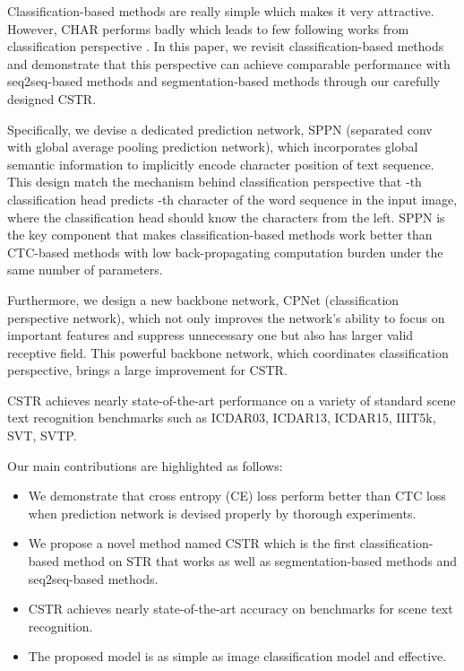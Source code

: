 \documentclass[final]{cvpr}
\begin{document}
Classification-based methods \cite{jaderberg14c} are really simple which makes it very attractive. However, CHAR performs badly which leads to few following works from classification perspective \cite{borisyuk2018rosetta}. In this paper, we revisit classification-based methods and demonstrate that this perspective can achieve comparable performance with seq2seq-based methods and segmentation-based methods through our carefully designed CSTR.

Specifically, we devise a dedicated prediction network, SPPN (separated conv with global average pooling prediction network), which incorporates global semantic information to implicitly encode character position of text sequence. This design match the mechanism behind classification perspective that -th classification head predicts -th character of the word sequence in the input image, where the classification head should know the  characters from the left. SPPN is the key component that makes classification-based methods work better than CTC-based methods with low back-propagating computation burden under the same number of parameters.

Furthermore, we design a new backbone network, CPNet (classification perspective network), which not only improves the network's ability to focus on important features and suppress unnecessary one but also has larger valid receptive field. This powerful backbone network, which coordinates classification perspective, brings a large improvement for CSTR.

CSTR achieves nearly state-of-the-art performance on a variety of standard scene text recognition benchmarks such as ICDAR03, ICDAR13, ICDAR15, IIIT5k, SVT, SVTP.

Our main contributions are highlighted as follows:
\begin{itemize}

\item We demonstrate that cross entropy (CE) loss perform better than CTC loss when prediction network is devised properly by thorough experiments.

\item We propose a novel method named CSTR which is the first classification-based method on STR that works as well as segmentation-based methods and seq2seq-based methods.

\item CSTR achieves nearly state-of-the-art accuracy on benchmarks for scene text recognition.

\item The proposed model is as simple as image classification model and effective.
\end{itemize}
\end{document}
